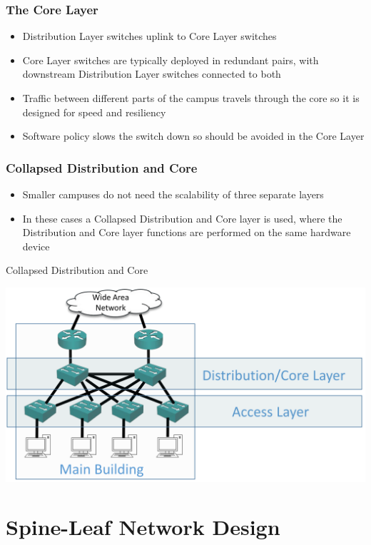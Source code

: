 \documentclass[pdflatex,compress,mathserif]{beamer}
\begin{document}
\begin{frame}
	\frametitle{The Core Layer}
	\begin{itemize}
		\item Distribution Layer switches uplink to Core Layer switches
		\item Core Layer switches are typically deployed in redundant pairs, with
downstream Distribution Layer switches connected to both
		\item Traffic between different parts of the campus travels through the core
so it is designed for speed and resiliency
		\item Software policy slows the switch down so should be avoided in the
Core Layer
	\end{itemize}
\end{frame}

\begin{frame}
	\frametitle{Collapsed Distribution and Core}
	\begin{itemize}
		\item Smaller campuses do not need the scalability of three separate layers
		\item In these cases a Collapsed Distribution and Core layer is used, where
the Distribution and Core layer functions are performed on the same
hardware device
	\end{itemize}
\end{frame}

\begin{frame}{Collapsed Distribution and Core}
	\begin{center}
		\includegraphics[width=\linewidth]{img/img04}
	\end{center}
\end{frame}

\section{Spine-Leaf Network Design}
\end{document}
